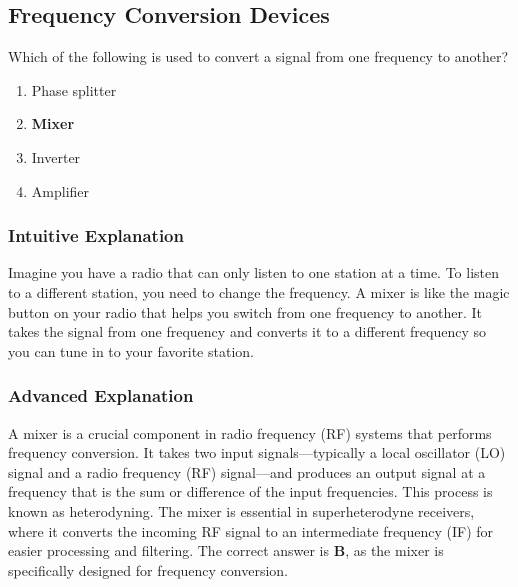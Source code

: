 \subsection{Frequency Conversion Devices}
\label{T7A03}

\begin{tcolorbox}[colback=gray!10!white,colframe=black!75!black,title=T7A03]
Which of the following is used to convert a signal from one frequency to another?
\begin{enumerate}[noitemsep]
    \item Phase splitter
    \item \textbf{Mixer}
    \item Inverter
    \item Amplifier
\end{enumerate}
\end{tcolorbox}

\subsubsection*{Intuitive Explanation}
Imagine you have a radio that can only listen to one station at a time. To listen to a different station, you need to change the frequency. A mixer is like the magic button on your radio that helps you switch from one frequency to another. It takes the signal from one frequency and converts it to a different frequency so you can tune in to your favorite station.

\subsubsection*{Advanced Explanation}
A mixer is a crucial component in radio frequency (RF) systems that performs frequency conversion. It takes two input signals—typically a local oscillator (LO) signal and a radio frequency (RF) signal—and produces an output signal at a frequency that is the sum or difference of the input frequencies. This process is known as heterodyning. The mixer is essential in superheterodyne receivers, where it converts the incoming RF signal to an intermediate frequency (IF) for easier processing and filtering. The correct answer is \textbf{B}, as the mixer is specifically designed for frequency conversion.